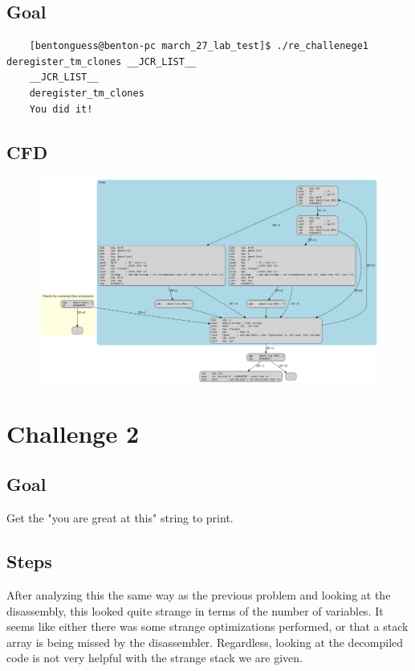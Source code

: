 \documentclass[11pt]{article}
\begin{document}
\subsection*{Goal}
\begin{lstlisting}
    [bentonguess@benton-pc march_27_lab_test]$ ./re_challenege1 deregister_tm_clones __JCR_LIST__
    __JCR_LIST__
    deregister_tm_clones
    You did it!
\end{lstlisting}


\subsection*{CFD}
\begin{figure}[H]
    \centering
    \includegraphics[width=0.99\linewidth]{./graphviz/challenge1.png}
\end{figure}


\section*{Challenge 2}
\subsection*{Goal}
Get the "you are great at this" string to print.
\subsection*{Steps}
After analyzing this the same way as the previous problem and looking at the disassembly, this looked quite strange in terms of the number of variables. It seems like either there was some strange optimizations performed, or that a stack array is being missed by the disassembler. Regardless, looking at the decompiled code is not very helpful with the strange stack we are given.
\end{document}
